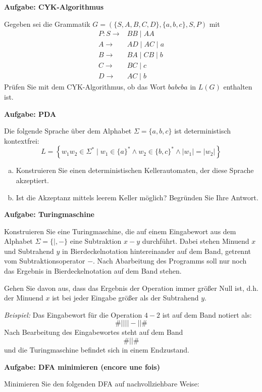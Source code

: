 \documentclass[a4paper,12pt]{article}
\newcommand{\Aufgabe}[1]{
	{
		\vspace*{1cm}
		\textsf{\textbf{Aufgabe: #1}}
		\vspace*{0.2cm}
		
	}
}
\begin{document}
	\Aufgabe{CYK-Algorithmus}
	
	Gegeben sei die Grammatik $G=(\{S, A, B, C, D\}, \{a, b, c\}, S, P)$ mit
	\begin{align*}
		P:S\rightarrow & BB \mid AA\\
		A\rightarrow & AD \mid AC \mid a\\
		B\rightarrow & BA \mid CB \mid b\\
		C\rightarrow & BC \mid c\\
		D\rightarrow & AC \mid b
	\end{align*}
	Prüfen Sie mit dem CYK-Algorithmus, ob das Wort $babcba$ in $L(G)$ enthalten ist.

	\pagebreak
	
	\Aufgabe{PDA}
	
	Die folgende Sprache über dem Alphabet $\Sigma=\{a, b, c\}$ ist deterministisch kontextfrei:
	$$L = \left\{w_1w_2 \in \Sigma^* \mid w_1 \in \{a\}^* \land w_2 \in \{b, c\}^* \land |w_1|=|w_2|\right\}$$
		
	\begin{enumerate}[a)]
		\item Konstruieren Sie einen deterministischen Kellerautomaten, der diese Sprache akzeptiert.
		\item Ist die Akzeptanz mittels leerem Keller möglich? Begründen Sie Ihre Antwort.
	\end{enumerate}


	\Aufgabe{Turingmaschine}
	
	Konstruieren Sie eine Turingmaschine, die auf einem Eingabewort aus dem Alphabet $\Sigma = \{|, -\}$ eine Subtraktion $x-y$ durchführt. Dabei stehen Minuend $x$ und Subtrahend $y$ in Bierdeckelnotation hintereinander auf dem Band, getrennt vom Subtraktionsoperator $-$. Nach Abarbeitung des Programms soll nur noch das Ergebnis in	Bierdeckelnotation auf dem Band stehen.
	
	Gehen Sie davon aus, dass das Ergebnis der Operation immer größer Null ist, d.h. der Minuend $x$ ist bei jeder Eingabe größer als der Subtrahend $y$.
	
	\emph{Beispiel:} Das Eingabewort für die Operation $4-2$ ist auf dem Band notiert als:
	$$\#||||-||\#$$
	Nach Bearbeitung des Eingabewortes steht auf dem Band
	$$\#||\#$$
	und die Turingmaschine befindet sich in einem Endzustand.
	
	\pagebreak
	
	\Aufgabe{DFA minimieren (encore une fois)}
	
	Minimieren Sie den folgenden DFA auf nachvollziehbare Weise:\\
	
\end{document}
